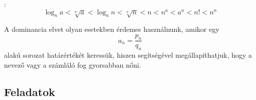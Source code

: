 \documentclass[a4paper, 12pt]{scrartcl}
\begin{document}
\begin{blueBox}
  :
  \[
    \log_n a <
    \sqrt[n]{a} <
    \log_a n <
    \sqrt[a]{n} <
    n <
    n^a <
    a^n <
    n! <
    n^n
  \]
\end{blueBox}

\begin{note}
  A dominancia elvet olyan esetekben érdemes használnunk, amikor egy
  \[
    a_n = \frac{p_n}{q_n}
  \]
  alakú sorozat határértékét keressük, hiszen segítségével megállapíthatjuk,
  hogy a nevező vagy a számláló fog gyorsabban nőni.
\end{note}

\clearpage
\subsection{Feladatok}
\end{document}
